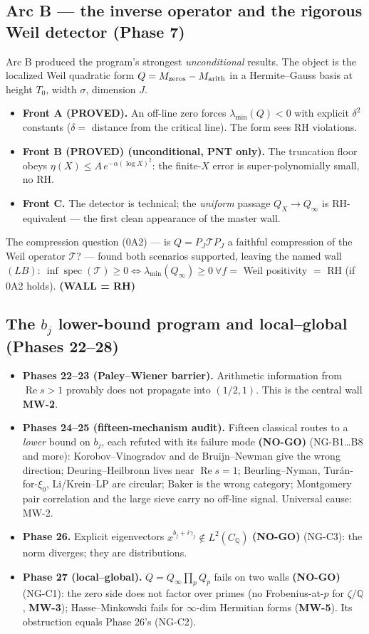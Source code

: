 \documentclass[11pt]{amsart}
\theoremstyle{definition}
\theoremstyle{remark}
\newcommand{\PROVED}{\textbf{(PROVED)}}
\newcommand{\NOGO}{\textbf{(NO-GO)}}
\newcommand{\WALL}{\textbf{(WALL = RH)}}
\begin{document}
\subsection{Arc B --- the inverse operator and the rigorous Weil detector (Phase 7)}
Arc B produced the program's strongest \emph{unconditional} results. The object is the
localized Weil quadratic form $Q=M_{\rm zeros}-M_{\rm arith}$ in a Hermite--Gauss basis at
height $T_0$, width $\sigma$, dimension $J$.
\begin{itemize}[leftmargin=*]
\item \textbf{Front A \PROVED.} An off-line zero forces $\lambda_{\min}(Q)<0$ with explicit
$\delta^2$ constants ($\delta=$ distance from the critical line). The form sees RH violations.
\item \textbf{Front B \PROVED{} (unconditional, PNT only).} The truncation floor obeys
$\eta(X)\le A\,e^{-\alpha(\log X)^2}$: the finite-$X$ error is super-polynomially small, no RH.
\item \textbf{Front C.} The detector is technical; the \emph{uniform} passage $Q_X\to Q_\infty$
is RH-equivalent --- the first clean appearance of the master wall.
\end{itemize}
The compression question (0A2) --- is $Q=P_J\mathcal T P_J$ a faithful compression of the Weil
operator $\mathcal T$? --- found both scenarios supported, leaving the named wall
$(LB):\ \inf\operatorname{spec}(\mathcal T)\ge0\iff\lambda_{\min}(Q_\infty)\ge0\ \forall
f=$ Weil positivity $=$ RH (if 0A2 holds). \WALL

\subsection{The $b_j$ lower-bound program and local--global (Phases 22--28)}
\begin{itemize}[leftmargin=*]
\item \textbf{Phases 22--23 (Paley--Wiener barrier).} Arithmetic information from
$\operatorname{Re}s>1$ provably does not propagate into $(1/2,1)$. This is the central wall
\textbf{MW-2}.
\item \textbf{Phases 24--25 (fifteen-mechanism audit).} Fifteen classical routes to a
\emph{lower} bound on $b_j$, each refuted with its failure mode \NOGO{} (NG-B1\dots B8 and more):
Korobov--Vinogradov and de Bruijn--Newman give the wrong direction; Deuring--Heilbronn lives
near $\operatorname{Re}s=1$; Beurling--Nyman, Tur\'an-for-$\xi_0$, Li/Krein--LP are circular;
Baker is the wrong category; Montgomery pair correlation and the large sieve carry no off-line
signal. Universal cause: MW-2.
\item \textbf{Phase 26.} Explicit eigenvectors $x^{b_j+i\gamma_j}\notin L^2(C_{\mathbb Q})$
\NOGO{} (NG-C3): the norm diverges; they are distributions.
\item \textbf{Phase 27 (local--global).} $Q=Q_\infty\prod_pQ_p$ fails on two walls \NOGO{}
(NG-C1): the zero side does not factor over primes (no Frobenius-at-$p$ for $\zeta/\mathbb Q$,
\textbf{MW-3}); Hasse--Minkowski fails for $\infty$-dim Hermitian forms (\textbf{MW-5}). Its
obstruction equals Phase 26's (NG-C2).
\end{itemize}
\end{document}
